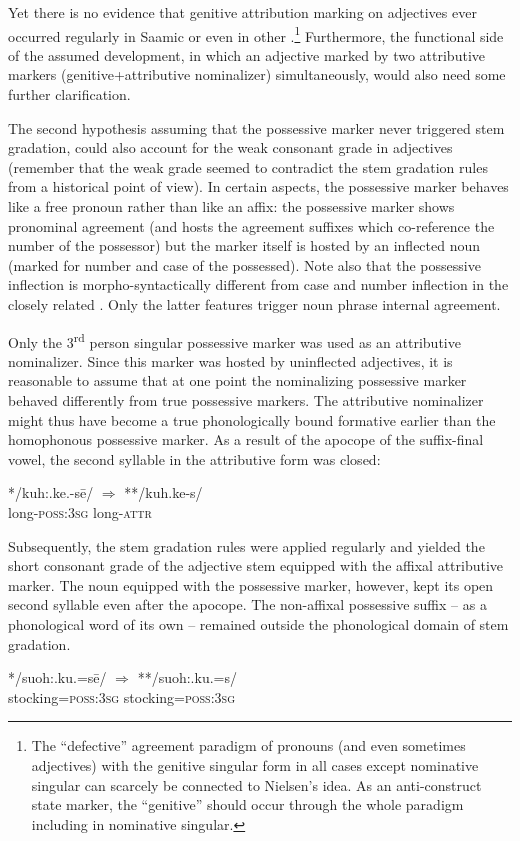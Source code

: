 {Yet there is no evidence that genitive attribution marking on adjectives ever occurred regularly in Saamic or even in other .\footnote{The “defective” agreement paradigm of pronouns (and even sometimes adjectives) with the genitive singular form in all cases except nominative singular can scarcely be connected to Nielsen's idea. As an anti\hyp{}construct state marker, the “genitive” should occur through the whole paradigm including in nominative singular.} Furthermore, the functional side of the assumed development, in which an adjective marked by two attributive markers (genitive+attributive nominalizer) simultaneously, would also need some further clarification.

The second hypothesis assuming that the possessive marker never triggered stem gradation, could also account for the weak consonant grade in adjectives (remember that the weak grade seemed to contradict the stem gradation rules from a historical point of view). In certain aspects, the possessive marker behaves like a free pronoun rather than like an affix: the possessive marker shows pronominal agreement (and hosts the agreement suffixes which co-reference the number of the possessor) but the marker itself is hosted by an inflected noun (marked for number and case of the possessed). Note also that the possessive inflection is morpho-syntactically different from case and number inflection in the closely related . Only the latter features trigger noun phrase internal agreement.

Only the 3\textsuperscript{rd} person singular possessive marker was used as an attributive nominalizer. Since this marker was hosted by uninflected adjectives, it is reasonable to assume that at one point the nominalizing possessive marker behaved differently from true possessive markers. The attributive nominalizer might thus have become a true phonologically bound formative earlier than the homophonous possessive marker. As a result of the apocope of the suffix-final vowel, the second syllable in the attributive form was closed:
\begin{exe}
\ex 
\gll	**/kuh:.ke.-sē/ $\Rightarrow$ **/kuh.ke-s/\\
	long-\textsc{poss:3sg} {} long-\textsc{attr}\\
\end{exe}
Subsequently, the stem gradation rules were applied regularly and yielded the short consonant grade of the adjective stem equipped with the affixal attributive marker. The noun equipped with the possessive marker, however, kept its open second syllable even after the apocope. The non-affixal possessive suffix – as a phonological word of its own – remained outside the phonological domain of stem gradation.
\begin{exe}
\ex 
\gll	**/suoh:.ku.=sē/ $\Rightarrow$ **/suoh:.ku.=s/\\
	stocking=\textsc{poss:3sg} {} stocking=\textsc{poss:3sg}\\
\end{exe}

}
